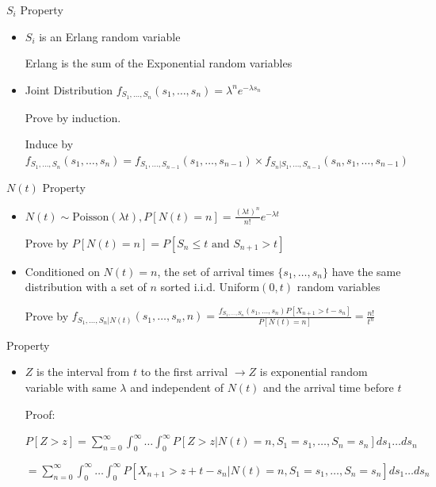\documentclass[a4paper]{article}
\begin{document}
\begin{itemize}
\begin{itemize}
                $S_i$ Property
                \begin{itemize}
                    \item $S_i$ is an Erlang random variable

                        Erlang is the sum of the Exponential random variables
                    \item Joint Distribution $f_{S_1, \dots, S_n}(s_1, \dots, s_n) = \lambda^n e^{-\lambda s_n}$

                        Prove by induction.

                        Induce by $f_{S_1, \dots, S_n}(s_1, \dots, s_n) = f_{S_1, \dots, S_{n-1}}(s_1, \dots, s_{n-1}) \times f_{S_n | S_1, \dots, S_{n-1}}(s_n, s_1, \dots, s_{n-1})$
                \end{itemize}
                $N(t)$ Property
                \begin{itemize}
                    \item $N(t) \sim \text{Poisson}(\lambda t), P[N(t) = n] = \frac{(\lambda t)^n}{n!}e^{-\lambda t}$ 

                        Prove by $P[N(t) = n] = P[S_n \leq t \text{ and } S_{n+1} > t]$
                    \item Conditioned on $N(t) = n$, the set of arrival times $\{s_1, \dots, s_n\}$ have the same distribution with a set of $n$ sorted i.i.d. Uniform$(0, t)$ random variables

                        Prove by $f_{S_1, \dots, S_n | N(t)}(s_1, \dots, s_n, n) = \frac{f_{S_1, \dots, S_n}(s_1, \dots, s_n) P[X_{n+1} > t - s_n]}{P[N(t) = n]} = \frac{n!}{t^n}$
                \end{itemize}
                Property
                \begin{itemize}
                    \item $Z$ is the interval from $t$ to the first arrival $\rightarrow Z$ is exponential random variable with same $\lambda$ and independent of $N(t)$ and the arrival time before $t$

                        Proof:

                        $P[Z > z] = \sum_{n = 0}^\infty \int_0^\infty \dots \int_0^\infty P[Z>z|N(t) = n, S_1 = s_1, \dots, S_n = s_n] ds_1 \dots ds_n$

                        $= \sum_{n = 0}^\infty \int_0^\infty \dots \int_0^\infty P[X_{n+1}>z+t-s_n|N(t) = n, S_1 = s_1, \dots, S_n = s_n] ds_1 \dots ds_n$


\end{itemize}
\end{itemize}
\end{itemize}
\end{document}
